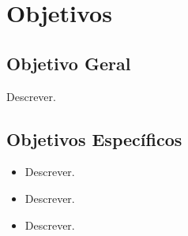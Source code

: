 \chapter{Objetivos}

\section{Objetivo Geral}

Descrever. 

\section{Objetivos Específicos}

\begin{itemize}
	\item Descrever. 

	\item Descrever. 

	\item Descrever. 
\end{itemize}

